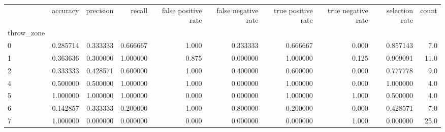 \begin{tabular}{lrrrrrrrrr}
\toprule
{} &  accuracy &  precision &    recall &  false positive rate &  false negative rate &  true positive rate &  true negative rate &  selection rate &  count \\
throw\_zone &           &            &           &                      &                      &                     &                     &                 &        \\
\midrule
0          &  0.285714 &   0.333333 &  0.666667 &                1.000 &             0.333333 &            0.666667 &               0.000 &        0.857143 &    7.0 \\
1          &  0.363636 &   0.300000 &  1.000000 &                0.875 &             0.000000 &            1.000000 &               0.125 &        0.909091 &   11.0 \\
2          &  0.333333 &   0.428571 &  0.600000 &                1.000 &             0.400000 &            0.600000 &               0.000 &        0.777778 &    9.0 \\
4          &  0.500000 &   0.500000 &  1.000000 &                1.000 &             0.000000 &            1.000000 &               0.000 &        1.000000 &    4.0 \\
5          &  1.000000 &   1.000000 &  1.000000 &                0.000 &             0.000000 &            1.000000 &               1.000 &        0.500000 &    4.0 \\
6          &  0.142857 &   0.333333 &  0.200000 &                1.000 &             0.800000 &            0.200000 &               0.000 &        0.428571 &    7.0 \\
7          &  1.000000 &   0.000000 &  0.000000 &                0.000 &             0.000000 &            0.000000 &               1.000 &        0.000000 &   25.0 \\
\bottomrule
\end{tabular}
